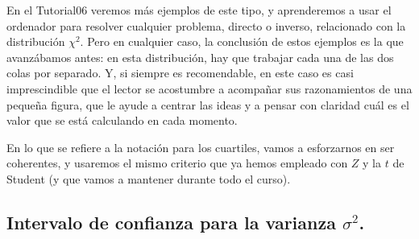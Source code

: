 En el Tutorial06 veremos más ejemplos de este tipo, y aprenderemos a usar el ordenador para
resolver cualquier problema, directo o inverso, relacionado con la distribución $\chi^2$. Pero en
cualquier caso, la conclusión de estos ejemplos es la que avanzábamos antes: en esta distribución,
hay que trabajar cada una de las dos colas por separado. Y, si siempre es recomendable, en este
caso es casi imprescindible que el lector se acostumbre a acompañar sus razonamientos de una
pequeña figura, que le ayude a centrar las ideas y a pensar con claridad cuál es el valor que se
está calculando en cada momento.

En lo que se refiere a la notación para los cuartiles, vamos a esforzarnos en
ser coherentes, y usaremos el mismo criterio que ya hemos empleado con $Z$ y la
$t$ de Student (y que vamos a mantener durante todo el curso).

    \begin{center}
    \end{center}

\subsection{Intervalo de confianza para la varianza $\sigma^2$.}
\label{cap06:subsec:IntervaloConfianzaVarianza}

